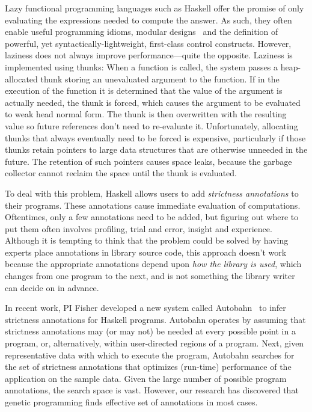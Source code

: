 Lazy functional programming languages such as
Haskell offer the promise of only evaluating the expressions needed
to compute the answer. As such, they often enable useful programming
idioms, modular designs~\cite{Hughes89} and the definition of powerful,
yet syntactically-lightweight, first-class control constructs. 
However, laziness does not always improve performance---quite the
opposite.  Laziness is implemented using thunks: When a function is called, the
system passes a heap-allocated thunk storing an unevaluated argument to
the function. If in the execution of the function it is determined that
the value of the argument is actually needed, the thunk is forced,
which causes the argument to be evaluated to weak head normal
form. The thunk is then overwritten with the resulting value so future
references don't need to re-evaluate it.  Unfortunately,
allocating thunks that always eventually need to be forced is expensive,
particularly if those thunks retain pointers to large data structures
that are otherwise unneeded in the future.  The retention of such
pointers causes space leaks, because the garbage collector cannot
reclaim the space until the thunk is evaluated.

To deal with this problem, Haskell allows users to add
\emph{strictness annotations} to their programs.  These annotations
cause immediate evaluation of computations. Oftentimes, only a few
annotations need to be added, but figuring out where to put them often
involves profiling, trial and error, insight and experience.  Although
it is tempting to think that the problem could be solved by having
experts place annotations in library source code, this approach
doesn't work because the appropriate annotations depend upon
\textit{how the library is used}, which changes from one program to
the next, and is not something the library writer can decide on in
advance.

In recent work, PI Fisher developed a new system called Autobahn~\cite{autobahn}
to infer strictness annotations for Haskell programs.  Autobahn
operates by assuming that strictness annotations may (or may not) be
needed at every possible point in a program, or, alternatively, within
user-directed regions of a program.  Next, given representative data with which to
execute the program, Autobahn searches for the set of strictness annotations
that optimizes (run-time) performance of the application on the sample data.
Given the large number of possible program annotations, the search space is 
vast.  However, our research has discovered that genetic programming finds
effective set of annotations in most cases.

